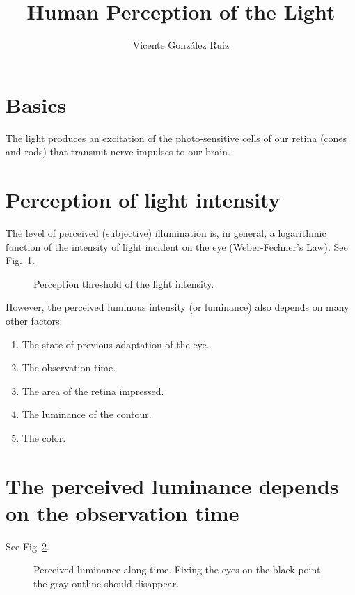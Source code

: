 \title{Human Perception of the Light}
\author{Vicente González Ruiz}
\maketitle

\section{Basics}
The light produces an excitation of the photo-sensitive cells of our
retina (cones and rods) that transmit nerve impulses to our brain.

\section{Perception of light intensity}
The level of perceived (subjective) illumination is, in general, a
logarithmic function of the intensity of light incident on the eye
(Weber-Fechner's Law). See Fig.~\ref{fig:light_perception_threshold}.

\begin{figure}
  \caption{Perception threshold of the light intensity.} %
  \label{fig:light_perception_threshold}
\end{figure}

However, the perceived luminous intensity (or luminance) also depends on many other factors:
\begin{enumerate}
\tightlist
\item The state of previous adaptation of the eye.
\item The observation time.
\item The area of the retina impressed.
\item The luminance of the contour.
\item The color.
\end{enumerate}

\section{The perceived luminance depends on the observation time}

See Fig~\ref{fig:perceived_luminance_along_time}.

\begin{figure}
  \caption{Perceived luminance along time. Fixing the eyes on the black point, the gray outline should disappear.} %
  \label{fig:perceived_luminance_along_time}
\end{figure}

